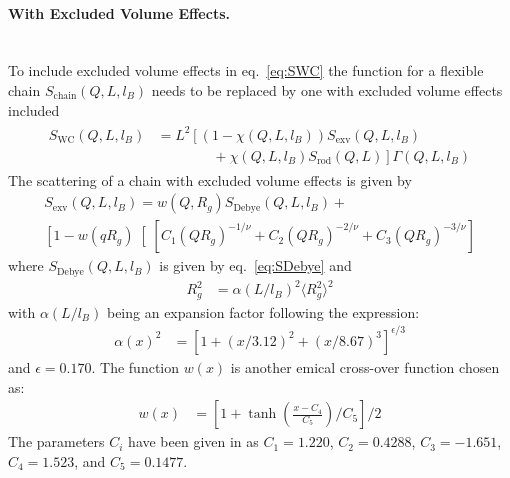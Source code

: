 \clearpage
\paragraph*{\textbf{With Excluded Volume Effects.}}~\\

To include excluded volume effects in eq.\ \ref{eq:SWC} the function for a flexible chain $S_\text{chain}(Q,L,l_B)$ needs to be replaced by one with excluded volume effects included
\begin{align}
\label{eq:exvSWC}
\begin{split}
S_\text{WC}(Q,L,l_B) &= L^2 \left[  \left(1-\chi(Q,L,l_B)\right)
            S_\text{exv}(Q,L,l_B) \right. \\
&  \left. \qquad  \qquad  +\chi(Q,L,l_B) S_\text{rod}(Q,L)    \right] \Gamma(Q,L,l_B)
\end{split}
\end{align}
The scattering of a chain with excluded volume effects is given by
\begin{multline}
S_\text{exv}(Q,L,l_B) = w(Q,R_g) S_\text{Debye}(Q,L,l_B) + \\
 \left[1-w(q R_g)\right[\left[C_1\left(QR_g\right)^{-1/\nu}
                                           + C_2\left(QR_g\right)^{-2/\nu}
                                           + C_3\left(QR_g\right)^{-3/\nu}\right]
\end{multline}
where $S_\text{Debye}(Q,L,l_B)$ is given by eq.\ \ref{eq:SDebye} and
\begin{align}
R_g^2&=\alpha(L/l_B)^2 \langle R_g^2\rangle^2
\label{eq:RgexvWC}
\end{align}
with $\alpha(L/l_B)$ being an expansion factor following the expression:
\begin{align}
\alpha(x)^2 &= \left[ 1+(x/3.12)^2+(x/8.67)^3 \right]^{\epsilon/3}
\end{align}
and $\epsilon=0.170$. The function $w(x)$ is another emical cross-over function chosen as:
\begin{align}
w(x) &= \left[ 1+\tanh\left(\frac{x-C_4}{C_5}\right)/C_5 \right]/2
\end{align}
The parameters $C_i$ have been given in \cite{Pedersen96Macrom} as
$C_1=1.220$, $C_2=0.4288$, $C_3=-1.651$, $C_4=1.523$, and $C_5=0.1477$.

